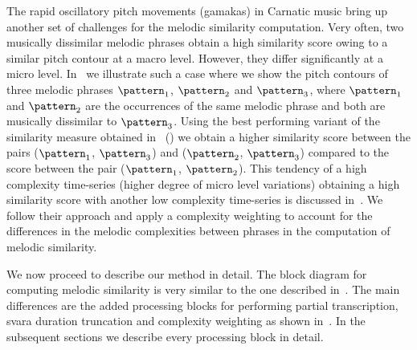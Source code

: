 The rapid oscillatory pitch movements (\glspl{gamaka}) in Carnatic music bring up another set of challenges for the melodic similarity computation. Very often, two musically dissimilar melodic phrases obtain a high similarity score owing to a similar pitch contour at a macro level. However, they differ significantly at a micro level. In~ we illustrate such a case where we show the pitch contours of three melodic phrases $\pattern_1$, $\pattern_2$ and $\pattern_3$, where $\pattern_1$ and $\pattern_2$ are the occurrences of the same melodic phrase and both are musically dissimilar to $\pattern_3$. Using the best performing variant of the similarity measure obtained in~ () we obtain a higher similarity score between the pairs ($\pattern_1$, $\pattern_3$) and ($\pattern_2$, $\pattern_3$) compared to the score between the pair ($\pattern_1$, $\pattern_2$). This tendency of a high complexity time-series (higher degree of micro level variations) obtaining a high similarity score with another low complexity time-series is discussed in~\cite{batista2011complexity}. We follow their approach and apply a complexity weighting to account for the differences in the melodic complexities between phrases in the computation of melodic similarity. 


We now proceed to describe our method in detail. The block diagram for computing melodic similarity is very similar to the one described in~. The main differences are the added processing blocks for performing partial transcription, \gls{svara} duration truncation and complexity weighting as shown in~. In the subsequent sections we describe every processing block in detail. 

